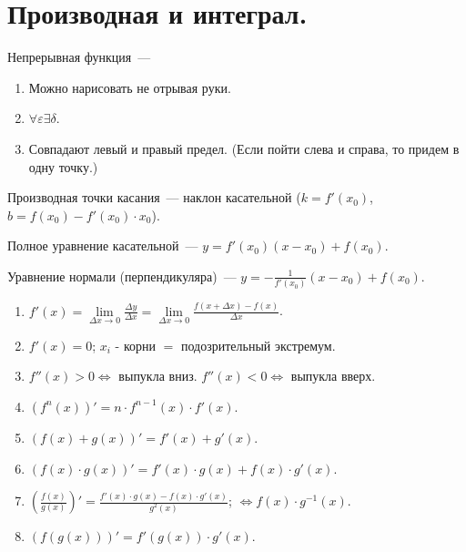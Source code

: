 \documentclass{article}
\begin{document}
	\section{Производная и интеграл.}
	\begin{definition}
		Непрерывная функция~---
		\begin{enumerate}
			\item Можно нарисовать не отрывая руки.
			\item $\forall \varepsilon \exists \delta$.
			\item Совпадают левый и правый предел. (Если пойти слева и справа, то придем в одну точку.)
		\end{enumerate}
	\end{definition}
	\begin{statement}
		Производная точки касания~--- наклон касательной ($k = f'(x_0)$, $b = f(x_0) - f'(x_0) \cdot x_0$).
	\end{statement}
	\begin{statement}
		Полное уравнение касательной~--- $y = f'(x_0)(x - x_0) + f(x_0)$.
	\end{statement}
	\begin{definition}
		Уравнение нормали (перпендикуляра)~--- $y = -\frac{1}{f'(x_0)}(x - x_0) + f(x_0)$.
	\end{definition}
	\begin{property}
		\begin{enumerate}
			\item $f'(x) = \lim\limits_{\varDelta x \rightarrow 0} \frac{\varDelta y}{\varDelta x} = \lim\limits_{\varDelta x \rightarrow 0} \frac{f(x + \varDelta x) - f(x)}{\varDelta x}$.
			\item $f'(x) = 0$; $x_i$ - корни $=$ подозрительный экстремум.
			\item $f''(x) > 0 \Leftrightarrow$ выпукла вниз. $f''(x) < 0 \Leftrightarrow$ выпукла вверх.
			\item $(f^n(x))' = n \cdot f^{n - 1}(x) \cdot f'(x)$.
			\item $(f(x) + g(x))' = f'(x) + g'(x)$.
			\item $(f(x) \cdot g(x))' = f'(x) \cdot g(x) + f(x) \cdot g'(x)$.
			\item $(\frac{f(x)}{g(x)})' = \frac{f'(x) \cdot g(x) - f(x) \cdot g'(x)}{g^2(x)}$; $\Leftrightarrow f(x) \cdot g^{-1}(x)$.
			\item $(f(g(x)))' = f'(g(x)) \cdot g'(x)$.
		\end{enumerate}
	\end{property}
\end{document}
